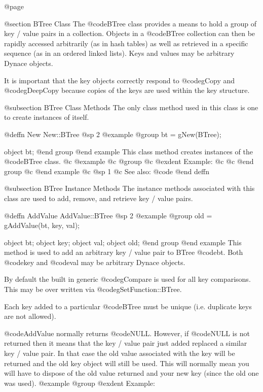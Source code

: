 @page

@section BTree Class
The @code{BTree} class provides a means to hold a group of key / value
pairs in a collection.  Objects in a @code{BTree} collection can then be
rapidly accessed arbitrarily (as in hash tables) as well as retrieved in
a specific sequence (as in an ordered linked lists).  Keys and values
may be arbitrary Dynace objects.

It is important that the key objects correctly respond to @code{gCopy}
and @code{gDeepCopy} because copies of the keys are used within the key
structure.

@subsection BTree Class Methods
The only class method used in this class is one to create instances of itself.



@deffn {New} New::BTree
@sp 2
@example
@group
bt = gNew(BTree);

object  bt;
@end group
@end example
This class method creates instances of the @code{BTree} class. 
@c @example
@c @group
@c @exdent Example:
@c 
@c @end group
@c @end example
@c @sp 1
@c See also:  @code{}
@end deffn



@subsection BTree Instance Methods
The instance methods associated with this class are used to add, remove,
and retrieve key / value pairs.





@deffn {AddValue} AddValue::BTree
@sp 2
@example
@group
old = gAddValue(bt, key, val);

object  bt;
object  key;
object  val;
object  old;
@end group
@end example
This method is used to add an arbitrary key / value pair to BTree
@code{bt}.  Both @code{key} and @code{val} may be arbitrary Dynace
objects.

By default the built in generic @code{gCompare} is used for all key comparisons.
This may be over written via @code{gSetFunction::BTree}.

Each key added to a particular @code{BTree} must be unique
(i.e. duplicate keys are not allowed).

@code{AddValue} normally returns @code{NULL}.  However, if @code{NULL}
is not returned then it means that the key / value pair just added
replaced a similar key / value pair.  In that case the old value
associated with the key will be returned and the old key object will
still be used.  This will normally mean you will have to dispose of
the old value returned and your new key (since the old one was used).
@example
@group
@exdent Example:

